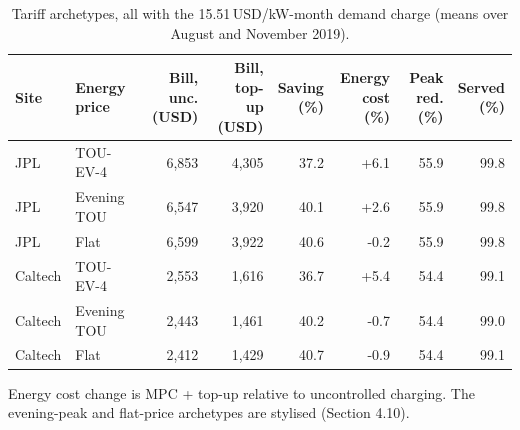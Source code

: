 \begin{table}[H]
\centering
\caption{Tariff archetypes, all with the 15.51\,USD/kW-month demand charge (means over August and November 2019).}
\label{tab:arch}
\footnotesize
\setlength{\tabcolsep}{1.5pt}
\begin{tabular*}{\textwidth}{@{\extracolsep{\fill}}llrrrrrr@{}}
\hline
Site & Energy price & \makecell[c]{Bill, unc.\\(USD)} & \makecell[c]{Bill, top-\\up (USD)} & \makecell[c]{Saving\\(\%)} & \makecell[c]{Energy\\cost (\%)} & \makecell[c]{Peak\\red. (\%)} & \makecell[c]{Served\\(\%)} \\
\hline
JPL & TOU-EV-4 & 6,853 & 4,305 & 37.2 & +6.1 & 55.9 & 99.8 \\
JPL & Evening TOU & 6,547 & 3,920 & 40.1 & +2.6 & 55.9 & 99.8 \\
JPL & Flat & 6,599 & 3,922 & 40.6 & -0.2 & 55.9 & 99.8 \\
\hline
Caltech & TOU-EV-4 & 2,553 & 1,616 & 36.7 & +5.4 & 54.4 & 99.1 \\
Caltech & Evening TOU & 2,443 & 1,461 & 40.2 & -0.7 & 54.4 & 99.0 \\
Caltech & Flat & 2,412 & 1,429 & 40.7 & -0.9 & 54.4 & 99.1 \\
\hline
\end{tabular*}
\par\smallskip\parbox{\textwidth}{\scriptsize Energy cost change is MPC + top-up relative to uncontrolled charging. The evening-peak and flat-price archetypes are stylised (Section 4.10).}
\end{table}
